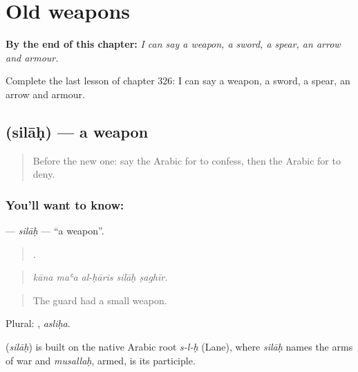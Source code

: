 
\chapter{Old weapons}
\label{ch:ar-old-weapons}

\begin{chapteropening}
\textbf{By the end of this chapter:} \emph{I can say a weapon, a sword, a spear, an arrow and armour.}

Complete the last lesson of chapter 326: I can say a weapon, a sword, a spear, an arrow and armour.
\end{chapteropening}

\section[\texorpdfstring{\ar{سلاح} (silāḥ)}{سلاح (silāḥ)}]{ (silāḥ) — a weapon}

\label{lesson:AR-C326-silah}



\begin{quote}
Before the new one: say the Arabic for to confess, then the Arabic for to deny.
\end{quote}

\subsection*{You'll want to know: }
\textbf{} — \emph{silāḥ} — \textquotedblleft{}a weapon\textquotedblright{}.

\begin{quote}
    .
\end{quote}

\begin{quote}
\emph{kāna maʿa al-ḥāris silāḥ ṣaghīr.}
\end{quote}

\begin{quote}
The guard had a small weapon.
\end{quote}

Plural: , \emph{asliḥa}.

\begin{cousinweb}
\textbf{} (\emph{silāḥ}) is built on the native Arabic root \emph{s-l-ḥ} (Lane), where \emph{silāḥ} names the arms of war and \emph{musallaḥ}, armed, is its participle.
\end{cousinweb}

